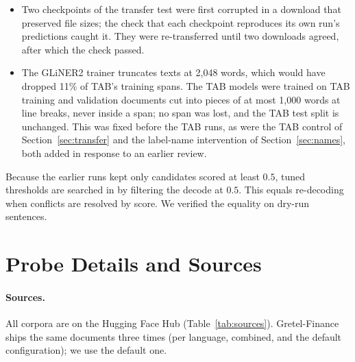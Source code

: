 \documentclass[11pt]{article}
\begin{document}
\begin{itemize}
which raised the question whether the unguarded runs of objective (b)
had too. Re-running (b) with seed 42 on OpenPII and Kiji in that exact
configuration, counting rather than stopping, found no skipped batch and
no NaN loss; other seeds were not re-run.
\item Two checkpoints of the transfer test were first corrupted in a
download that preserved file sizes; the check that each checkpoint
reproduces its own run's predictions caught it. They were re-transferred
until two downloads agreed, after which the check passed.
\item The GLiNER2 trainer truncates texts at 2{,}048 words, which would
have dropped 11\% of TAB's training spans. The TAB models were trained
on TAB training and validation documents cut into pieces of at most
1{,}000 words at line breaks, never inside a span; no span was lost, and
the TAB test split is unchanged. This was fixed before the TAB runs, as
were the TAB control of Section~\ref{sec:transfer} and the label-name
intervention of Section~\ref{sec:names}, both added in response to an
earlier review.
\end{itemize}
Because the earlier runs kept only candidates scored at least $0.5$,
tuned thresholds are searched in \tuneGrid{} by filtering the decode at
$0.5$. This equals re-decoding when conflicts are resolved by score. We
verified the equality on dry-run sentences.

\FloatBarrier
\section{Probe Details and Sources}
\label{app:probes}

\paragraph{Sources.}
All corpora are on the Hugging Face Hub (Table~\ref{tab:sources}).
Gretel-Finance ships the same documents three times (per language,
combined, and the default configuration); we use the default one.
\end{document}
